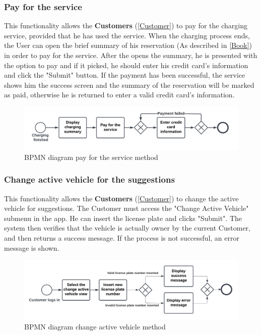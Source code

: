 \subsubsection{Pay for the service}
This functionality allows the \textbf{Customers} (\ref{Customer}) to pay for the charging service, provided that he has used the service.
When the charging process ends, the User can open the brief summary of his reservation (As described in \ref{Book}) in order to pay for the service.
After the opens the summary, he is presented with the option to pay and if it picked, he should enter his credit card's information and click the "Submit" button.
If the payment has been successful, the service shows him the success screen and the summary of the reservation will be marked as paid, otherwise he is returned to enter a valid credit card's information.
\begin{figure}[H]
    \begin{center}
        \includegraphics[width=\textwidth]{img/fun-pay.png}
        \caption{BPMN diagram pay for the service method}
    \end{center}
\end{figure}
\subsubsection{Change active vehicle for the suggestions}
This functionality allows the \textbf{Customers} (\ref{Customer}) to change the active vehicle for suggestions.
The Customer must access the "Change Active Vehicle" submenu in the app.
He can insert the license plate and clicks "Submit". The system then verifies that the vehicle is actually owner by the current Customer, and then returns a success message. If the process is not successful, an error message is shown.
\begin{figure}[H]
    \begin{center}
        \includegraphics[width=\textwidth]{img/fun-cha-v.png}
        \caption{BPMN diagram change active vehicle method}
    \end{center}
\end{figure}
